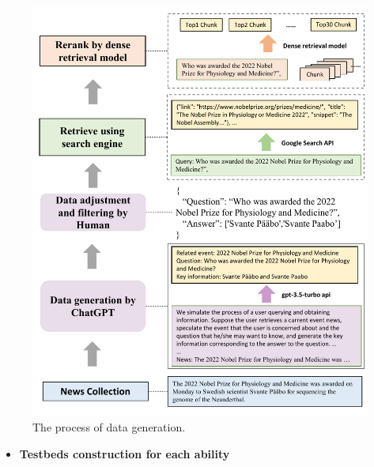 \documentclass{beamer}
\begin{document}
\begin{frame}
    \begin{figure}[h]
        \centering
        \includegraphics[height=.75\textheight]{./images/figures/data.pdf}
        \caption{The process of data generation.}
    \end{figure}
    \begin{itemize}
        \item {\bfseries{Testbeds construction for each ability}}
    \end{itemize}
\end{frame}
\end{document}
